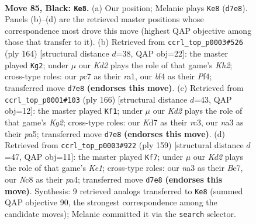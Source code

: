 \documentclass[11pt]{article}
\begin{document}
\clearpage

\begin{figure}[p]\centering
\begin{subfigure}{0.46\textwidth}\centering
\resizebox{\linewidth}{!}{%
\newchessgame
\chessboard[
  setfen={2n3K1/2Pk4/p7/P4p1p/4pBb1/Nr4P1/8/R7 b - - 77 85},
  showmover=false,
  pgfstyle=straightmove, color=movearrow, markmove={d7-e8}
]}
\caption{}
\end{subfigure}\hfill
\begin{subfigure}{0.46\textwidth}\centering
\resizebox{\linewidth}{!}{%
\newchessgame
\chessboard[
  setfen={8/7p/1p3k2/1BbR1p1P/P1P2P2/8/7K/r7 w - - 85 83},
  showmover=false,
  pgfstyle=straightmove, color=movearrow, markmove={h2-g2}
]}
\caption{}
\end{subfigure}
\\[4pt]
\begin{subfigure}{0.46\textwidth}\centering
\resizebox{\linewidth}{!}{%
\newchessgame
\chessboard[
  setfen={8/2b1k3/5p2/pR3B1p/P3P2P/1Pr5/6K1/8 w - - 3 84},
  showmover=false,
  pgfstyle=straightmove, color=movearrow, markmove={g2-f1}
]}
\caption{}
\end{subfigure}\hfill
\begin{subfigure}{0.46\textwidth}\centering
\resizebox{\linewidth}{!}{%
\newchessgame
\chessboard[
  setfen={4k3/2R1b2p/1p5P/p3p1p1/P1P1P1K1/1r3B2/8/8 b - - 10 80},
  showmover=false,
  pgfstyle=straightmove, color=movearrow, markmove={e8-f7}
]}
\caption{}
\end{subfigure}
\caption{\textbf{Move 85, Black: \texttt{Ke8}.} (a) Our position; Melanie plays \texttt{Ke8} (\texttt{d7e8}). Panels (b)--(d) are the retrieved master positions whose correspondence most drove this move (highest QAP objective among those that transfer to it). (b) Retrieved from \texttt{ccrl\_top\_p0003\#526} (ply 164) [structural distance $d$=38, QAP obj=22]: the master played \texttt{Kg2}; under $\mu$ our \emph{Kd2} plays the role of that game's \emph{Kh2}; cross-type roles: our \emph{p}c7 as their \emph{r}a1, our \emph{b}f4 as their \emph{P}f4; transferred move \texttt{d7e8} \textbf{(endorses this move)}. (c) Retrieved from \texttt{ccrl\_top\_p0001\#103} (ply 166) [structural distance $d$=43, QAP obj=12]: the master played \texttt{Kf1}; under $\mu$ our \emph{Kd2} plays the role of that game's \emph{Kg2}; cross-type roles: our \emph{K}d7 as their \emph{r}c3, our \emph{n}a3 as their \emph{p}a5; transferred move \texttt{d7e8} \textbf{(endorses this move)}. (d) Retrieved from \texttt{ccrl\_top\_p0003\#922} (ply 159) [structural distance $d$=47, QAP obj=11]: the master played \texttt{Kf7}; under $\mu$ our \emph{Kd2} plays the role of that game's \emph{Ke1}; cross-type roles: our \emph{n}a3 as their \emph{B}e7, our \emph{N}c8 as their \emph{p}a4; transferred move \texttt{d7e8} \textbf{(endorses this move)}. Synthesis: 9 retrieved analogs transferred to \texttt{Ke8} (summed QAP objective 90, the strongest correspondence among the candidate moves); Melanie committed it via the \texttt{search} selector.}
\label{fig:thought-m169}
\end{figure}
\end{document}
